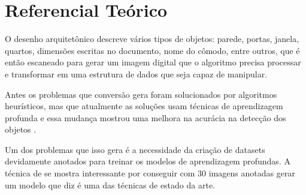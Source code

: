 \chapter{Referencial Teórico}\label{cp:refteory}
\ABNTEXchapterfont


O desenho arquitetônico descreve vários tipos de objetos: parede, portas, janela, quartos, dimensões escritas no documento, nome do cômodo, entre outros, que é então escaneado para gerar um imagem digital que o algoritmo precisa processar e transformar em uma estrutura de dados que seja capaz de manipular.

Antes os problemas que conversão gera foram solucionados por algoritmos heurísticos, mas que atualmente as soluções usam técnicas de aprendizagem profunda \iffalse referênciar? \fi e essa mudança mostrou uma melhora na acurácia na detecção dos objetos \cite{3dplanet2021}.

Um dos problemas que isso gera é a necessidade da criação de datasets devidamente anotados para treinar os modelos de aprendizagem profundas. A técnica de \cite{3dplanet2021} se mostra interessante por conseguir com 30 imagens anotadas gerar um modelo que \cite{kratochvila2024multi} diz é uma das técnicas de estado da arte.









